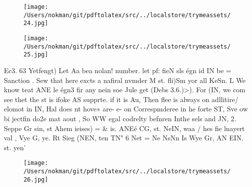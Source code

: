 \documentclass[a4paper,12pt]{article}
\begin{document}
\vspace{10pt}

\begin{figure}[h]

\texttt{[image: /Users/nokman/git/pdftolatex/src/../localstore/trymeassets/24.jpg]}

\centering

\end{figure}

\par

\vspace{10pt}

\begin{figure}[h]

\texttt{[image: /Users/nokman/git/pdftolatex/src/../localstore/trymeassets/25.jpg]}

\centering

\end{figure}

\par

\vspace{10pt}

    Ec3. 63 Yetfengt)  Let Aa bea nolan! number. let pf: fieN sls égn id IN be = Sanction .  Sew that here excts a nafiral nvmder M st. fli)Sm yor all KeSn.    L We know teat ANE le égn3 fir any nein soe Jule get (Debs 3.6.)>).    For (IN, we com see thet the st is ifoke AS supprte. if it is Au,  Then flee is always on adllitire/ elomot in IN, Hal does nt hove»  are- e- on Correspmderee in he forte ST, Sve ow bi jectfin do2e mat aout ,  So WW egal codrelty befnren Inthe sels and JN,    2. Seppe Gr sin, st Ahem ieises) = \& is.  ANEé CG, st. NeIN, waa /\/ hes fie lnayert val ,  Vye G, ye. Rt Sieg (NEN, ten TN" 6 Net = Ne  NsNn  Is Wye Gr, AN EIN. st. yen’ 

\vspace{10pt}

\par

\vspace{10pt}

\begin{figure}[h]

\texttt{[image: /Users/nokman/git/pdftolatex/src/../localstore/trymeassets/26.jpg]}

\centering

\end{figure}
\end{document}
